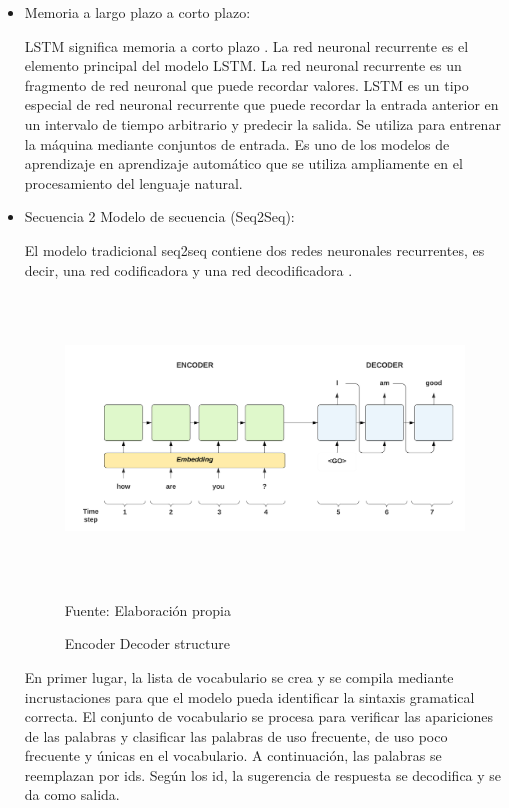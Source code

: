 \documentclass[../Main.tex]{subfiles}
\begin{document}
\begin{itemize}
	\item Memoria a largo plazo a corto plazo:\par
    LSTM significa memoria a corto plazo \cite{16}. La red neuronal recurrente es el elemento principal del modelo LSTM. La red neuronal recurrente es un fragmento de red neuronal que puede recordar valores. LSTM es un tipo especial de red neuronal recurrente que puede recordar la entrada anterior en un intervalo de tiempo arbitrario y predecir la salida. Se utiliza para entrenar la máquina mediante conjuntos de entrada. Es uno de los modelos de aprendizaje en aprendizaje automático que se utiliza ampliamente en el procesamiento del lenguaje natural.
    
	\item Secuencia 2 Modelo de secuencia (Seq2Seq): \par
    El modelo tradicional seq2seq contiene dos redes neuronales recurrentes, es decir, una red codificadora y una red decodificadora \cite{17}.
    \par
    \begin{figure}[H]
	\begin{Center}
		\includegraphics[width=6.4in,height=3in]{Images/encoder_decoder.png}
	    \caption{Encoder Decoder structure}
	    Fuente: Elaboración propia
        \label{fig:section}
	\end{Center}
    \end{figure}
    
    \begin{justify}
    En primer lugar, la lista de vocabulario se crea y se compila mediante incrustaciones para que el modelo pueda identificar la sintaxis gramatical correcta. El conjunto de vocabulario se procesa para verificar las apariciones de las palabras y clasificar las palabras de uso frecuente, de uso poco frecuente y únicas en el vocabulario. A continuación, las palabras se reemplazan por ids. Según los id, la sugerencia de respuesta se decodifica y se da como salida.
    \end{justify}\par
    

\end{itemize}
\end{document}
